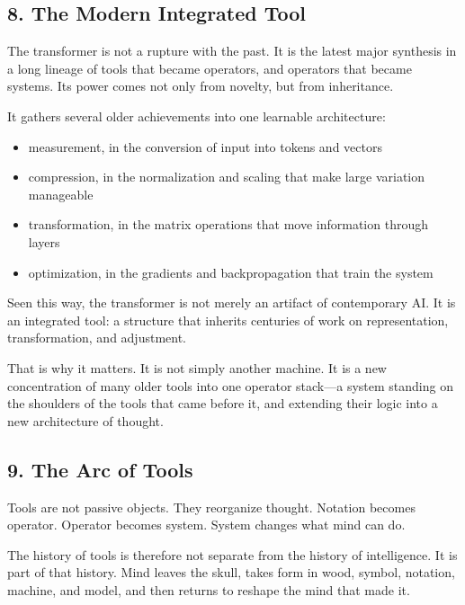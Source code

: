 \hypertarget{the-modern-integrated-tool}{%
\subsection{8. The Modern Integrated
Tool}\label{the-modern-integrated-tool}}

The transformer is not a rupture with the past. It is the latest major
synthesis in a long lineage of tools that became operators, and
operators that became systems. Its power comes not only from novelty,
but from inheritance.

It gathers several older achievements into one learnable architecture:

\begin{itemize}
\tightlist
\item
  measurement, in the conversion of input into tokens and vectors
\item
  compression, in the normalization and scaling that make large
  variation manageable
\item
  transformation, in the matrix operations that move information through
  layers
\item
  optimization, in the gradients and backpropagation that train the
  system
\end{itemize}

Seen this way, the transformer is not merely an artifact of contemporary
AI. It is an integrated tool: a structure that inherits centuries of
work on representation, transformation, and adjustment.

That is why it matters. It is not simply another machine. It is a new
concentration of many older tools into one operator stack---a system
standing on the shoulders of the tools that came before it, and
extending their logic into a new architecture of thought.

\hypertarget{the-arc-of-tools}{%
\subsection{9. The Arc of Tools}\label{the-arc-of-tools}}

Tools are not passive objects. They reorganize thought. Notation becomes
operator. Operator becomes system. System changes what mind can do.

The history of tools is therefore not separate from the history of
intelligence. It is part of that history. Mind leaves the skull, takes
form in wood, symbol, notation, machine, and model, and then returns to
reshape the mind that made it.

